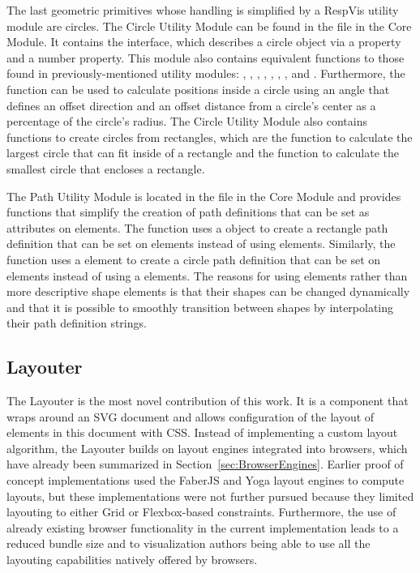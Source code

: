 The last geometric primitives whose handling is simplified by a RespVis utility module are circles.
The Circle Utility Module can be found in the  file in the Core Module.
It contains the  interface, which describes a circle object via a   property and a  number property.
This module also contains equivalent functions to those found in previously-mentioned utility modules: , , , , , , , and .
Furthermore, the  function can be used to calculate positions inside a circle using an angle that defines an offset direction and an offset distance from a circle's center as a percentage of the circle's radius.
The Circle Utility Module also contains functions to create circles from rectangles, which are the  function to calculate the largest circle that can fit inside of a rectangle and the  function to calculate the smallest circle that encloses a rectangle.

The Path Utility Module is located in the  file in the Core Module and provides functions that simplify the creation of path definitions that can be set as  attributes on  elements.
The  function uses a  object to create a rectangle path definition that can be set on  elements instead of using  elements.
Similarly, the  function uses a  element to create a circle path definition that can be set on  elements instead of using a  elements.
The reasons for using  elements rather than more descriptive shape elements is that their shapes can be changed dynamically and that it is possible to smoothly transition between shapes by interpolating their path definition strings.

\subsection{Layouter}
\label{sec:Layouter}

The Layouter is the most novel contribution of this work.
It is a component that wraps around an SVG document and allows configuration of the layout of elements in this document with CSS.
Instead of implementing a custom layout algorithm, the Layouter builds on layout engines integrated into browsers, which have already been summarized in Section~\ref{sec:BrowserEngines}.
Earlier proof of concept implementations used the FaberJS \parencite{FaberJS} and Yoga \parencite{Yoga} layout engines to compute layouts, but these implementations were not further pursued because they limited layouting to either Grid or Flexbox-based constraints.
Furthermore, the use of already existing browser functionality in the current implementation leads to a reduced bundle size and to visualization authors being able to use all the layouting capabilities natively offered by browsers.

